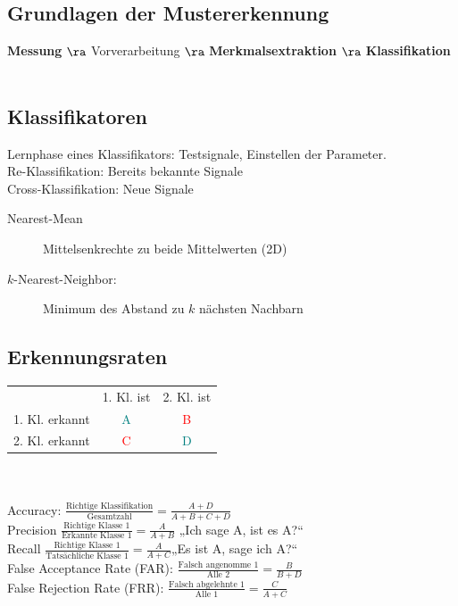 \documentclass[fs, footer]{latex4ei}
\begin{document}
\begin{multicols*}{4}

\section{Grundlagen der Mustererkennung}

\textbf{Messung} $\ra$ Vorverarbeitung $\ra$ \textbf{Merkmalsextraktion} $\ra$ \textbf{Klassifikation}\\
\\
\subsection{Klassifikatoren}
Lernphase eines Klassifikators: Testsignale, Einstellen der Parameter.\\
Re-Klassifikation: Bereits bekannte Signale\\
Cross-Klassifikation: Neue Signale\\
\begin{description}
	\item[Nearest-Mean] Mittelsenkrechte zu beide Mittelwerten (2D)
	\item[$k$-Nearest-Neighbor:] Minimum des Abstand zu $k$ nächsten Nachbarn
\end{description}

\subsection{Erkennungsraten}
\begin{tabular}{lcc}
	& 1. Kl. ist & 2. Kl. ist\\
1. Kl. erkannt & \textcolor{teal}{A} & \textcolor{red}{B}\\
2. Kl. erkannt & \textcolor{red}{C} & \textcolor{teal}{D}\\
\end{tabular}\\
\\
Accuracy: $\frac{\text{Richtige Klassifikation}}{\text{Gesamtzahl}} = \frac{A+D}{A+B+C+D}$\\
Precision $\frac{\text{Richtige Klasse 1}}{\text{Erkannte Klasse 1}} = \frac{A}{A+B}$ \qquad „Ich sage A, ist es A?“\\
Recall $\frac{\text{Richtige Klasse 1}}{\text{Tatsächliche Klasse 1}} = \frac{A}{A+C}$\qquad „Es ist A, sage ich A?“\\
False Acceptance Rate (FAR): $\frac{\text{Falsch angenomme 1}}{\text{Alle 2}} = \frac{B}{B+D}$\\
False Rejection Rate (FRR): $\frac{\text{Falsch abgelehnte 1}}{\text{Alle 1}} = \frac{C}{A+C}$


\end{multicols*}
\end{document}
